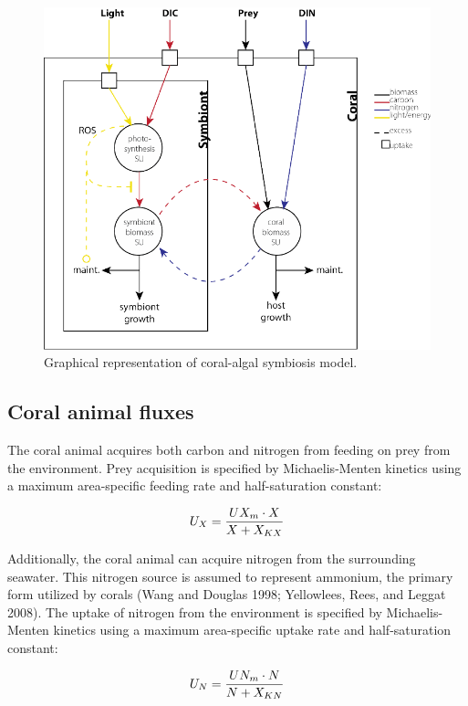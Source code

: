 \documentclass[]{elsarticle} %
\makeatletter
\def\maxwidth{\ifdim\Gin@nat@width>\linewidth\linewidth
\else\Gin@nat@width\fi}
\let\Oldincludegraphics\includegraphics
\renewcommand{\includegraphics}[1]{\Oldincludegraphics[width=\maxwidth]{#1}}
\makeatother
\begin{document}
\begin{figure}[htbp]
\centering
\includegraphics{JTB_ms_files/figure-latex/Fig1-1.pdf}
\caption{Graphical representation of coral-algal symbiosis model.}
\end{figure}

\subsection{Coral animal fluxes}\label{coral-animal-fluxes}

The coral animal acquires both carbon and nitrogen from feeding on prey
from the environment. Prey acquisition is specified by Michaelis-Menten
kinetics using a maximum area-specific feeding rate and half-saturation
constant:

\begin{equation} U_X = {{UX_m \cdot X} \over {X + X_{KX}}} \end{equation}

Additionally, the coral animal can acquire nitrogen from the surrounding
seawater. This nitrogen source is assumed to represent ammonium, the
primary form utilized by corals (Wang and Douglas 1998; Yellowlees,
Rees, and Leggat 2008). The uptake of nitrogen from the environment is
specified by Michaelis-Menten kinetics using a maximum area-specific
uptake rate and half-saturation constant:

\begin{equation} U_N = {{UN_m \cdot N} \over {N + X_{KN}}} \end{equation}
\end{document}
